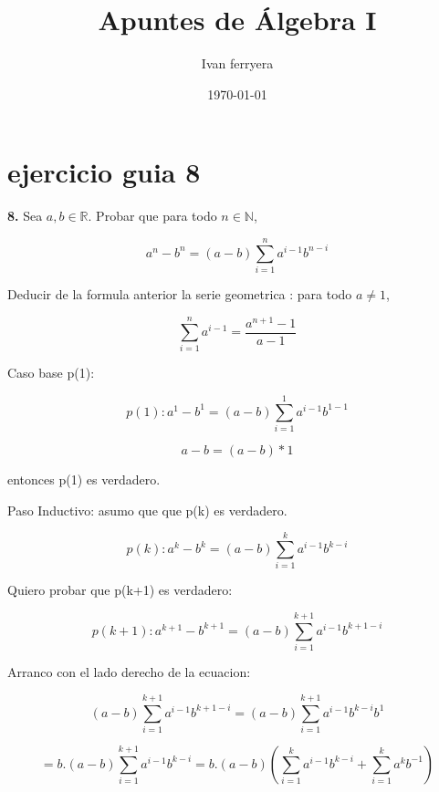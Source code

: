 \documentclass{article}
\title{Apuntes de Álgebra I}
\author{Ivan ferryera}
\date{\today}
\begin{document}
\maketitle

\section{ejercicio guia 8}

\textbf{8.} Sea $a, b \in \mathbb{R}$. Probar que para todo $n \in \mathbb{N}$, 

\[
a^n - b^n = (a-b)\sum_{i=1}^{n} a^{i-1}b^{n-i}
\]

Deducir de la formula anterior la serie geometrica : para todo $a \neq 1$,

\[
\sum_{i=1}^{n} a^{i-1} = \frac{a^{n+1}-1}{a-1}
\]

\medskip
{}
\medskip

Caso base p(1): 

\[
p(1): a^1- b^1 = (a-b)\sum_{i=1}^{1} a^{i-1}b^{1-1}
\]

\[
a- b = (a-b)*1
\]
 
entonces p(1) es verdadero.

\medskip
Paso Inductivo: asumo que que p(k) es verdadero.

\[
p(k): a^k - b^k = (a-b)\sum_{i=1}^{k} a^{i-1}b^{k-i}
\]

Quiero probar que p(k+1) es verdadero:

\[
p(k+1): a^{k+1} - b^{k+1} = (a-b)\sum_{i=1}^{k+1} a^{i-1}b^{k+1-i}
\]

Arranco con el lado derecho de la ecuacion:

\[
(a-b)\sum_{i=1}^{k+1} a^{i-1}b^{k+1-i}  = (a-b)\sum_{i=1}^{k+1} a^{i-1}b^{k-i}b^{1}
\]

\medskip
{}
\[
= b.(a-b)\sum_{i=1}^{k+1} a^{i-1}b^{k-i} = b.(a-b)(\sum_{i=1}^{k} a^{i-1}b^{k-i}+ \sum_{i=1}^{k} a^{k}b^{-1})
\]
\end{document}
